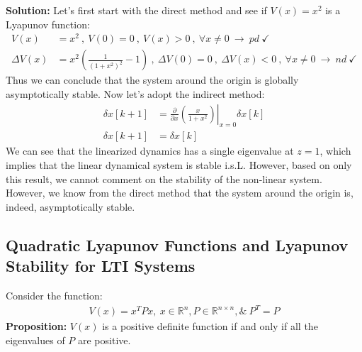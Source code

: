\documentclass[twoside, 11pt]{article}
\begin{document}
\textbf{Solution:} Let's first start with the direct method and see if $V(x) = x^2$ is a Lyapunov function:
%
\begin{align*}
V(x) &= x^2 \ , \ V(0) = 0 \ , \ V(x) > 0 \ , \ \forall x \neq 0 \ \rightarrow \ pd \ \checkmark
\\
\Delta V(x) &= x^2 \left( \frac{1}{(1 + x^2)^2} - 1 \right)  \ , \ \Delta V(0) = 0 \ , \ \Delta V(x) < 0 \ , \ \forall x \neq 0 \ \rightarrow \ nd \ \checkmark
\end{align*}
%
Thus we can conclude that the system around the origin is globally asymptotically stable. Now
let's adopt the indirect method:
%
\begin{align*}
 \delta x[k+1] &= \left. \frac{\partial}{\partial x} \left(
 \frac{x}{1 + x^2} \right) \right|_{x=0} \delta x[k]
 \\
\delta x[k+1] &= \delta x[k]
\end{align*}
%
We can see that the linearized dynamics has a single eigenvalue at $z = 1$, which implies that the linear dynamical system is stable i.s.L. However, based on only this result, we cannot comment on the stability of the non-linear system. However, we know from the direct method that the system around the origin is, indeed, asymptotically stable.

\subsection{Quadratic Lyapunov Functions and Lyapunov Stability for LTI Systems}

Consider the function:
%
\begin{align*}
V(x) = x^T P x , \ x \in \mathbb{R}^{n} , P \in \mathbb{R}^{n \times n} , \& \ P^T = P
\end{align*}
%
\textbf{Proposition:} $V(x)$ is a positive definite function if and only if all the eigenvalues of 
$P$ are positive.
\end{document}

